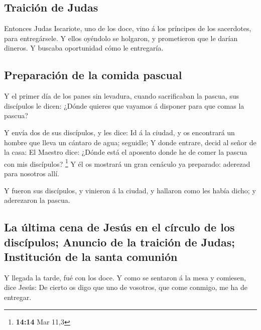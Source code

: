 \hypertarget{traiciuxf3n-de-judas}{%
\subsection{Traición de Judas}\label{traiciuxf3n-de-judas}}

 Entonces Judas Iscariote, uno de los doce, vino á los
príncipes de los sacerdotes, para entregársele.  Y ellos
oyéndolo se holgaron, y prometieron que le darían dineros. Y buscaba
oportunidad cómo le entregaría.

\hypertarget{preparaciuxf3n-de-la-comida-pascual}{%
\subsection{Preparación de la comida
pascual}\label{preparaciuxf3n-de-la-comida-pascual}}

 Y el primer día de los panes sin levadura, cuando
sacrificaban la pascua, sus discípulos le dicen: ¿Dónde quieres que
vayamos á disponer para que comas la pascua?

 Y envía dos de sus discípulos, y les dice: Id á la
ciudad, y os encontrará un hombre que lleva un cántaro de agua;
seguidle;  Y donde entrare, decid al señor de la casa: El
Maestro dice: ¿Dónde está el aposento donde he de comer la pascua con
mis discípulos? \footnote{\textbf{14:14} Mar 11,3}  Y él
os mostrará un gran cenáculo ya preparado: aderezad para nosotros allí.

 Y fueron sus discípulos, y vinieron á la ciudad, y
hallaron como les había dicho; y aderezaron la pascua.

\hypertarget{la-uxfaltima-cena-de-jesuxfas-en-el-cuxedrculo-de-los-discuxedpulos-anuncio-de-la-traiciuxf3n-de-judas-instituciuxf3n-de-la-santa-comuniuxf3n}{%
\subsection{La última cena de Jesús en el círculo de los discípulos;
Anuncio de la traición de Judas; Institución de la santa
comunión}\label{la-uxfaltima-cena-de-jesuxfas-en-el-cuxedrculo-de-los-discuxedpulos-anuncio-de-la-traiciuxf3n-de-judas-instituciuxf3n-de-la-santa-comuniuxf3n}}

 Y llegada la tarde, fué con los doce.  Y
como se sentaron á la mesa y comiesen, dice Jesús: De cierto os digo que
uno de vosotros, que come conmigo, me ha de entregar.

